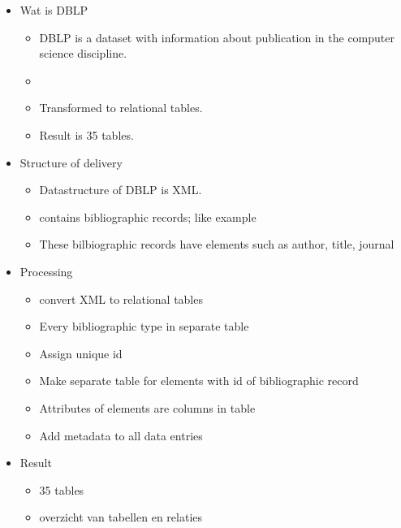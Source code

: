 \documentclass{ou-report}
\newcommand{\outline}[1]{{\color{blue} #1}}
\begin{document}
\outline{
\begin{itemize}
    \item Wat is DBLP
    \begin{itemize}
        \item DBLP is a dataset with information about publication in the computer science discipline.
        \item 
        \item Transformed to relational tables.
        \item Result is 35 tables.
    \end{itemize}

    \item Structure of delivery
    \begin{itemize}
        \item Datastructure of DBLP is XML.
        \item contains bibliographic records; like example
        \item These bilbiographic records have elements such as author, title, journal
    \end{itemize}
    \item Processing
    \begin{itemize}
        \item convert XML to relational tables
        \item Every bibliographic type in separate table
        \item Assign unique id
        \item Make separate table for elements with id of bibliographic record
        \item Attributes of elements are columns in table
        \item Add metadata to all data entries
    \end{itemize}
    \item Result
    \begin{itemize}
        \item 35 tables
        \item overzicht van tabellen en relaties
    \end{itemize}
\end{itemize}    
}
\end{document}
